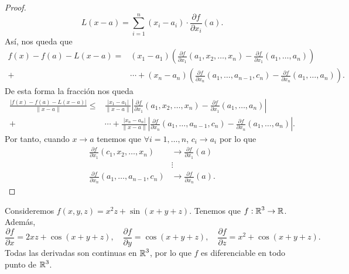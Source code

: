 \begin{proof}
\[L\left(x-a\right) = \sum^{n}_{i = 1}\left(x_{i}-a_{i}\right) \cdot \frac{\partial f}{\partial x_{i}}\left(a\right) .\]
Así, nos queda que
\[
\begin{split}
	 f\left(x\right)-f\left(a\right) - L\left(x-a\right) 
	 = & \left(x_{1}-a_{1}\right) \left(\frac{\partial f}{\partial x_{1}}\left(a_{1}, x_{2}, \ldots, x_{n}\right)-\frac{\partial f}{\partial x_{1}}\left(a_{1}, \ldots, a_{n}\right)\right) \\
	+ &  \cdots + \left(x_{n}-a_{n}\right)\left(\frac{\partial f}{\partial x_{n}}\left(a_{1}, \ldots, a_{n-1}, c_{n}\right)-\frac{\partial f}{\partial x_{n}}\left(a_{1}, \ldots, a_{n}\right)\right) .
\end{split}
\]
De esta forma la fracción nos queda
\[
\begin{split}
	\frac{ \left|f\left(x\right)-f\left(a\right)-L\left(x-a\right)\right|}{ \|x-a\|} \leq & \frac{ \left|x_{1}-a_{1}\right|}{\|x-a\|} \left|\frac{\partial f}{\partial x_{1}}\left(a_{1}, x_{2}, \ldots, x_{n}\right)-\frac{\partial f}{\partial x_{1}}\left(a_{1}, \ldots, a_{n}\right)\right| \\
	+ & \cdots + \frac{ \left|x_{n}-a_{n}\right|}{\|x-a\|} \left|\frac{\partial f}{\partial x_{n}}\left(a_{1}, \ldots, a_{n-1}, c_{n}\right)-\frac{\partial f}{\partial x_{n}}\left(a_{1}, \ldots, a_{n}\right)\right|.
\end{split}
\]
Por tanto, cuando $\displaystyle x \to a $ tenemos que $\displaystyle \forall i = 1, \ldots, n $, $\displaystyle c_{i} \to a_{i} $ por lo que 
\[
\begin{split}
	\frac{\partial f}{\partial x_{1}}\left(c_{1}, x_{2}, \ldots, x_{n}\right) & \to \frac{\partial f}{\partial x_{1}}\left(a\right) \\
& \vdots \\
	\frac{\partial f}{\partial x_{n}}\left(a_{1}, \ldots, a_{n-1}, c_{n}\right) & \to \frac{\partial f}{\partial x_{n}}\left(a\right).
\end{split}
\]
\end{proof}
\begin{eg}
Consideremos $\displaystyle f\left(x,y,z\right) = x^{2}z + \sin\left(x+y+z\right) $. Tenemos que $\displaystyle f : \mathbb{R}^{3} \to \mathbb{R} $. Además, 
\[\frac{\partial f}{\partial x} = 2xz + \cos\left(x+y+z\right), \quad \frac{\partial f}{\partial y}= \cos\left(x+y+z\right), \quad \frac{\partial f}{\partial z} = x^{2} + \cos\left(x+y+z\right) .\]
Todas las derivadas son continuas en $\displaystyle \mathbb{R}^{3} $, por lo que $\displaystyle f $ es diferenciable en todo punto de $\displaystyle \mathbb{R}^{3} $. 
\end{eg}
